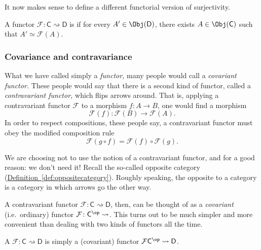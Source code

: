 \documentclass[notes.tex]{subfiles}
\begin{document}
It now makes sense to define a different functorial version of surjectivity.

\begin{definition}
  \label{def:essentiallysurjective}
  A functor $\mathcal{F}\colon \mathsf{C} \rightsquigarrow \mathsf{D}$ is  if for every $A' \in \Obj(\mathsf{D})$, there exists $A \in \Obj(\mathsf{C})$ such that $A' \simeq \mathcal{F}(A)$.
\end{definition}


\subsubsection{Covariance and contravariance}

What we have called simply a \emph{functor,} many people would call a \emph{covariant functor.} These people would say that there is a second kind of functor, called a \emph{contravariant functor,} which flips arrows around. That is, applying a contravariant functor $\mathcal{F}$ to a morphism $f\colon A \to  B$, one would find a morphism
\begin{equation*}
  \mathcal{F}(f)\colon \mathcal{F}(B) \to \mathcal{F}(A).
\end{equation*}
In order to respect compositions, these people say, a contravariant functor must obey the modified composition rule
\begin{equation*}
  \mathcal{F}(g \circ f) = \mathcal{F}(f) \circ \mathcal{F}(g).
\end{equation*}

We are choosing not to use the notion of a contravariant functor, and for a good reason: we don't need it! Recall the so-called opposite category (\hyperref[def:oppositecategory]{Definition~\ref*{def:oppositecategory}}). Roughly speaking, the opposite to a category is a category in which arrows go the other way.

A contravariant functor $\mathcal{F}\colon \mathsf{C} \rightsquigarrow \mathsf{D}$, then, can be thought of as a \emph{covariant} (i.e.\ ordinary) functor $\mathcal{F}\colon \mathsf{C}^{\op} \rightsquigarrow$. This turns out to be much simpler and more convenient than dealing with two kinds of functors all the time.

\begin{definition}
  \label{def:contravariant_functor}
  A  $\mathcal{F}\colon \mathsf{C} \rightsquigarrow \mathsf{D}$ is simply a (covariant) functor $\mathcal{F}\mathsf{C}^{\op} \rightsquigarrow \mathsf{D}$.
\end{definition}
\end{document}
